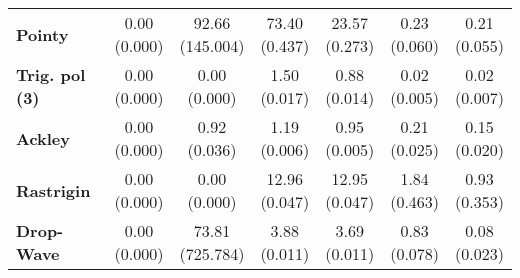 \begin{table}[t]
\begin{threeparttable}
\begin{tabular}{l|cccccc}
\vspace{6pt}\textbf{Pointy} & \cellbreak[t]{0.00\\\footnotesize(0.000)} & \cellbreak[t]{92.66\\\footnotesize(145.004)} & \cellbreak[t]{73.40\\\footnotesize(0.437)} & \cellbreak[t]{23.57\\\footnotesize(0.273)} & \cellbreak[t]{0.23\\\footnotesize(0.060)} & \cellbreak[t]{0.21\\\footnotesize(0.055)}\\
\vspace{6pt}\textbf{Trig. pol (3)} & \cellbreak[t]{0.00\\\footnotesize(0.000)} & \cellbreak[t]{0.00\\\footnotesize(0.000)} & \cellbreak[t]{1.50\\\footnotesize(0.017)} & \cellbreak[t]{0.88\\\footnotesize(0.014)} & \cellbreak[t]{0.02\\\footnotesize(0.005)} & \cellbreak[t]{0.02\\\footnotesize(0.007)}\\
\vspace{6pt}\textbf{Ackley} & \cellbreak[t]{0.00\\\footnotesize(0.000)} & \cellbreak[t]{0.92\\\footnotesize(0.036)} & \cellbreak[t]{1.19\\\footnotesize(0.006)} & \cellbreak[t]{0.95\\\footnotesize(0.005)} & \cellbreak[t]{0.21\\\footnotesize(0.025)} & \cellbreak[t]{0.15\\\footnotesize(0.020)}\\
\vspace{6pt}\textbf{Rastrigin} & \cellbreak[t]{0.00\\\footnotesize(0.000)} & \cellbreak[t]{0.00\\\footnotesize(0.000)} & \cellbreak[t]{12.96\\\footnotesize(0.047)} & \cellbreak[t]{12.95\\\footnotesize(0.047)} & \cellbreak[t]{1.84\\\footnotesize(0.463)} & \cellbreak[t]{0.93\\\footnotesize(0.353)}\\
\vspace{6pt}\textbf{Drop-Wave} & \cellbreak[t]{0.00\\\footnotesize(0.000)} & \cellbreak[t]{73.81\\\footnotesize(725.784)} & \cellbreak[t]{3.88\\\footnotesize(0.011)} & \cellbreak[t]{3.69\\\footnotesize(0.011)} & \cellbreak[t]{0.83\\\footnotesize(0.078)} & \cellbreak[t]{0.08\\\footnotesize(0.023)}\\

\end{tabular}
\end{threeparttable}
\end{table}
